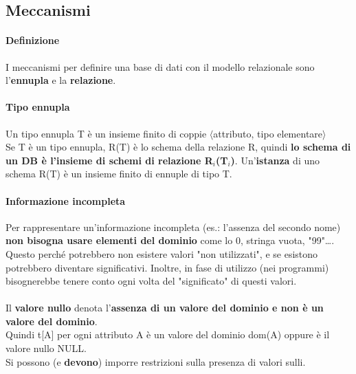 \documentclass[10pt]{book}
\begin{document}
\subsection{Meccanismi}
\paragraph{Definizione} I meccanismi per definire una base di dati con il modello relazionale sono l'\textbf{ennupla} e la \textbf{relazione}.
\paragraph{Tipo ennupla} Un tipo ennupla T è un insieme finito di coppie $\langle$attributo, tipo elementare$\rangle$\\
Se T è un tipo ennupla, R(T) è lo schema della relazione R, quindi \textbf{lo schema di un DB è l'insieme di schemi di relazione R$_i$(T$_i$)}. Un'\textbf{istanza} di uno schema R(T) è un insieme finito di ennuple di tipo T.
\paragraph{Informazione incompleta} Per rappresentare un'informazione incompleta (es.: l'assenza del secondo nome) \textbf{non bisogna usare elementi del dominio} come lo 0, stringa vuota, "99"\ldots.\\
Questo perché potrebbero non esistere valori "non utilizzati", e se esistono potrebbero diventare significativi. Inoltre, in fase di utilizzo (nei programmi) bisognerebbe tenere conto ogni volta del "significato" di questi valori.\\\\
Il \textbf{valore nullo} denota l'\textbf{assenza di un valore del dominio e non è un valore del dominio}.\\
Quindi t[A] per ogni attributo A è un valore del dominio dom(A) oppure è il valore nullo NULL.\\
Si possono (e \textbf{devono}) imporre restrizioni sulla presenza di valori sulli.
\end{document}
